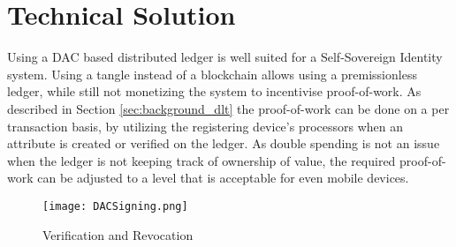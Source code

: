 \chapter{Technical Solution}
\label{chap:solution}


Using a DAC based distributed ledger is well suited for a Self-Sovereign Identity system. Using a tangle instead of a blockchain allows using a premissionless ledger, while still not monetizing the system to incentivise proof-of-work. As described in Section \ref{sec:background_dlt} the proof-of-work can be done on a per transaction basis, by utilizing the registering device's processors when an attribute is created or verified on the ledger. As double spending is not an issue when the ledger is not keeping track of ownership of value, the required proof-of-work can be adjusted to a level that is acceptable for even mobile devices.

\begin{figure}[ht]
    \centering
    \texttt{[image: DACSigning.png]}
    \caption{Verification and Revocation}
    \label{fig:dac_sign}
\end{figure}
